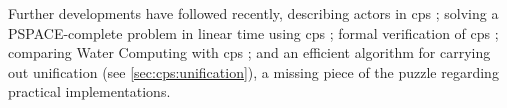 Further developments have followed recently, describing \glspl{actor} in \gls{cps} \cite{Henderson2019};  solving a PSPACE-complete problem in linear time using \gls{cps} \cite{Henderson2020}; formal verification of \gls{cps} \cite{Liu2020,Liu2021a}; comparing Water Computing with \gls{cps} \cite{Henderson2021}; and an efficient algorithm for carrying out unification \cite{Liu2021} (see \cref{sec:cps:unification}), a missing piece of the puzzle regarding practical implementations.













